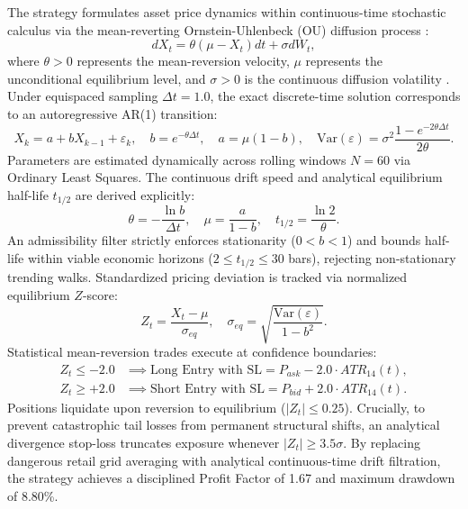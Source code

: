 \documentclass[11pt,a4paper]{article}
\begin{document}
The strategy formulates asset price dynamics within continuous-time stochastic calculus via the mean-reverting Ornstein-Uhlenbeck (OU) diffusion process \cite{uhlenbeck1930theory, vasicek1977equilibrium}:
\begin{equation}
dX_t = \theta (\mu - X_t) dt + \sigma dW_t,
\end{equation}
where $\theta > 0$ represents the mean-reversion velocity, $\mu$ represents the unconditional equilibrium level, and $\sigma > 0$ is the continuous diffusion volatility \cite{avellaneda2010statistical}.
Under equispaced sampling $\Delta t = 1.0$, the exact discrete-time solution corresponds to an autoregressive AR(1) transition:
\begin{equation}
X_k = a + b X_{k-1} + \varepsilon_k, \quad b = e^{-\theta \Delta t}, \quad a = \mu (1 - b), \quad \text{Var}(\varepsilon) = \sigma^2 \frac{1 - e^{-2\theta \Delta t}}{2\theta}.
\end{equation}
Parameters are estimated dynamically across rolling windows $N = 60$ via Ordinary Least Squares. The continuous drift speed and analytical equilibrium half-life $t_{1/2}$ are derived explicitly:
\begin{equation}
\theta = -\frac{\ln b}{\Delta t}, \quad \mu = \frac{a}{1 - b}, \quad t_{1/2} = \frac{\ln 2}{\theta}.
\end{equation}
An admissibility filter strictly enforces stationarity ($0 < b < 1$) and bounds half-life within viable economic horizons ($2 \le t_{1/2} \le 30$ bars), rejecting non-stationary trending walks.
Standardized pricing deviation is tracked via normalized equilibrium $Z$-score:
\begin{equation}
Z_t = \frac{X_t - \mu}{\sigma_{eq}}, \quad \sigma_{eq} = \sqrt{\frac{\text{Var}(\varepsilon)}{1 - b^2}}.
\end{equation}
Statistical mean-reversion trades execute at confidence boundaries:
\begin{align}
Z_t \le -2.0 & \implies \text{Long Entry with } \text{SL} = P_{ask} - 2.0 \cdot ATR_{14}(t), \\
Z_t \ge +2.0 & \implies \text{Short Entry with } \text{SL} = P_{bid} + 2.0 \cdot ATR_{14}(t).
\end{align}
Positions liquidate upon reversion to equilibrium ($|Z_t| \le 0.25$). Crucially, to prevent catastrophic tail losses from permanent structural shifts, an analytical divergence stop-loss truncates exposure whenever $|Z_t| \ge 3.5\sigma$. By replacing dangerous retail grid averaging with analytical continuous-time drift filtration, the strategy achieves a disciplined Profit Factor of 1.67 and maximum drawdown of 8.80\%.
\end{document}
